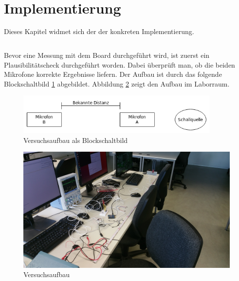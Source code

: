 \newpage
\section{Implementierung}
Dieses Kapitel widmet sich der der konkreten Implementierung.

\subsection{\microphone}
Bevor eine Messung mit dem Board durchgeführt wird, ist zuerst ein Plausibilitätscheck durchgeführt worden. Dabei überprüft man, ob die beiden \microphone \platz Mikrofone korrekte Ergebnisse liefern. Der Aufbau ist durch das folgende Blockschaltbild \ref{img:blockschaltbild_plausibilitaetscheck} abgebildet. Abbildung \ref{img:picture_plausibilitaetscheck} zeigt den Aufbau im Laborraum.

\begin{figure}[H]
        \centering
        \includegraphics[width=0.9\textwidth]{images/plausibilitaetscheck.png}
        \caption{Versuchsaufbau als Blockschaltbild}
        \label{img:blockschaltbild_plausibilitaetscheck}
\end{figure}

\begin{figure}[H]
        \centering
        \hspace*{-1.9cm}
        \includegraphics[width=1.2\textwidth]{images/plausibilitaetscheck_sparkfun_foto.jpg}
        \caption{Versuchsaufbau}
        \label{img:picture_plausibilitaetscheck}
\end{figure}

